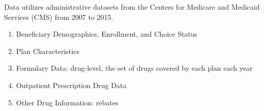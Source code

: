 \begin{frame}{Data}
    utilizes administrative datasets from the Centers for Medicare and Medicaid Services (CMS) from 2007 to 2015.

    \begin{enumerate}
        \item Beneficiary Demographics, Enrollment, and Choice Status
        \item Plan Characteristics 
        \item Formulary Data: drug-level, the set of drugs covered by each plan each year 
        \item Outpatient Prescription Drug Data
        \item Other Drug Information: rebates
    \end{enumerate}
\end{frame}